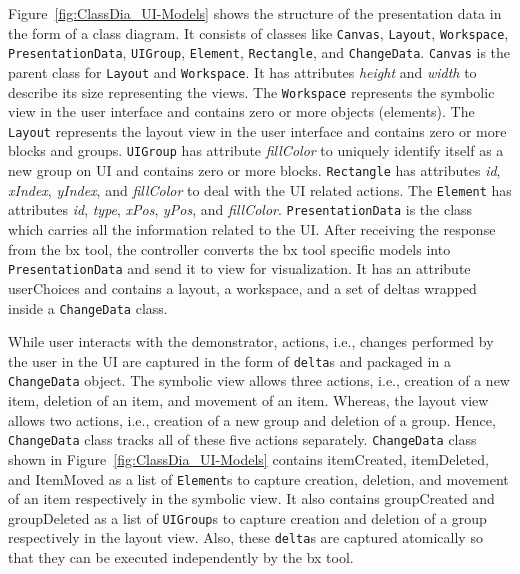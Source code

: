 Figure~\ref{fig:ClassDia_UI-Models} shows the structure of the presentation data in the form of a class diagram. It consists of classes like \texttt{Canvas}, \texttt{Layout}, \texttt{Workspace}, \texttt{PresentationData}, \texttt{UIGroup}, \texttt{Element}, \texttt{Rectangle}, and \texttt{ChangeData}. \texttt{Canvas} is the parent class for \texttt{Layout} and \texttt{Workspace}. It has attributes \textit{height} and \textit{width} to describe its size representing the views. The \texttt{Workspace} represents the symbolic view in the user interface and contains zero or more objects (elements). The \texttt{Layout} represents the layout view in the user interface and contains zero or more blocks and groups. \texttt{UIGroup} has attribute \textit{fillColor} to uniquely identify itself as a new group on UI and contains zero or more blocks. \texttt{Rectangle} has attributes \textit{id}, \textit{xIndex}, \textit{yIndex}, and \textit{fillColor} to deal with the UI related actions. The \texttt{Element} has attributes \textit{id}, \textit{type}, \textit{xPos}, \textit{yPos}, and \textit{fillColor}. \texttt{PresentationData} is the class which carries all the information related to the UI. After receiving the response from the bx tool, the controller converts the bx tool specific models into \texttt{PresentationData} and send it to view for visualization. It has an attribute userChoices and contains a layout, a workspace, and a set of deltas wrapped inside a \texttt{ChangeData} class.

While user interacts with the demonstrator, actions, i.e., changes performed by the user in the UI are captured in the form of \texttt{delta}s and packaged in a \texttt{ChangeData} object. The symbolic view allows three actions, i.e., creation of a new item, deletion of an item, and movement of an item. Whereas, the layout view allows two actions, i.e., creation of a new group and deletion of a group. Hence, \texttt{ChangeData} class tracks all of these five actions separately. \texttt{ChangeData} class shown in Figure~\ref{fig:ClassDia_UI-Models} contains itemCreated, itemDeleted, and ItemMoved as a list of \texttt{Element}s to capture creation, deletion, and movement of an item respectively in the symbolic view. It also contains groupCreated and groupDeleted as a list of \texttt{UIGroup}s to capture creation and deletion of a group respectively in the layout view. Also, these \texttt{delta}s are captured atomically so that they can be executed independently by the bx tool.

